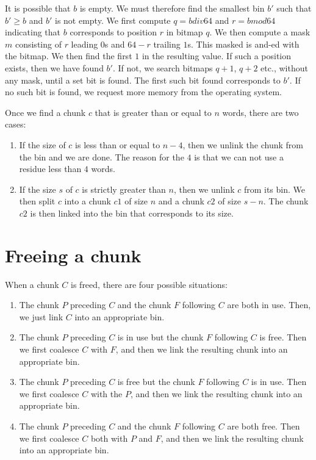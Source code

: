 It is possible that $b$ is empty.  We must therefore find the smallest
bin $b'$ such that $b' \ge b$ and $b'$ is not empty.  We first compute
$q = b div 64$ and $r = b mod 64$ indicating that $b$ corresponds to
position $r$ in bitmap $q$.  We then compute a mask $m$ consisting of
$r$ leading $0$s and $64-r$ trailing $1$s.  This masked is and-ed with
the bitmap.  We then find the first $1$ in the resulting value.  If
such a position exists, then we have found $b'$.  If not, we search
bitmaps $q+1$, $q+2$ etc., without any mask, until a set bit is
found.  The first such bit found corresponds to $b'$.  If no such bit
is found, we request more memory from the operating system.

Once we find a chunk $c$ that is greater than or equal to $n$ words,
there are two cases:

\begin{enumerate}
\item If the size of $c$ is less than or equal to $n-4$, then we
  unlink the chunk from the bin and we are done.  The reason for the
  $4$ is that we can not use a residue less than $4$ words.
\item If the size $s$ of $c$ is strictly greater than $n$, then we
  unlink $c$ from its bin.  We then split $c$ into a chunk $c1$ of
  size $n$ and a chunk $c2$ of size $s-n$.  The chunk $c2$ is then
  linked into the bin that corresponds to its size.
\end{enumerate}

\section{Freeing a chunk}

When a chunk $C$ is freed, there are four possible situations:

\begin{enumerate}
\item The chunk $P$ preceding $C$ and the chunk $F$ following $C$
  are both in use.  Then, we just link $C$ into an appropriate
  bin.
\item The chunk $P$ preceding $C$ is in use but the chunk $F$
  following $C$ is free.  Then we first coalesce $C$ with $F$, and
  then we link the resulting chunk into an appropriate bin.
\item The chunk $P$ preceding $C$ is free but the chunk $F$ following
  $C$ is in use.  Then we first coalesce $C$ with the $P$, and then we
  link the resulting chunk into an appropriate bin.
\item The chunk $P$ preceding $C$ and the chunk $F$ following $C$ are
  both free.  Then we first coalesce $C$ both with $P$ and $F$, and
  then we link the resulting chunk into an appropriate bin.
\end{enumerate}

